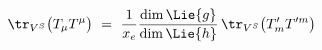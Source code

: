 \begin{equation}\label{Casimirrelation}
\tr_{V^{S}} \bigl(T_{\mu }T^{\mu }\bigr)\ =\ \frac{1}{x_{e}}\frac{\dim
\Lie{g}}{\dim \Lie{h}}\, \tr _{V^{S}} \bigl(T'_{m}T'^{m}\bigr)
\end{equation}

